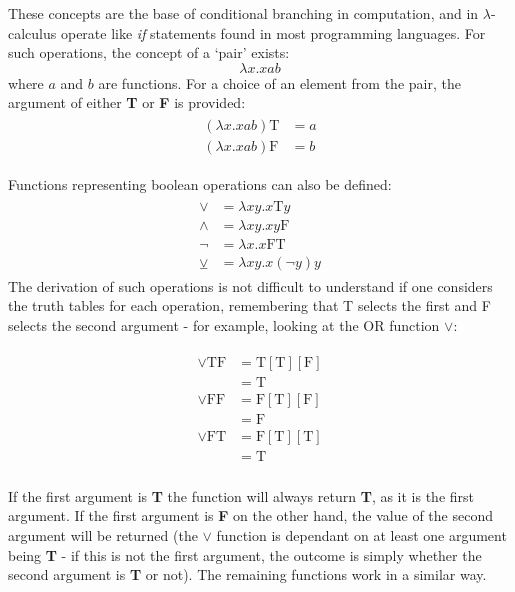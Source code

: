 \documentclass[Master.tex]{subfiles}
\begin{document}
These concepts are the base of conditional branching in computation, and in $\lambda$-calculus operate like \textit{if} statements found in most programming languages. For such operations, the concept of a `pair' exists:
\cite{church1941lambda}
\begin{equation*}
\lambda x.xab
\end{equation*}
where $a$ and $b$ are functions. For a choice of an element from the pair, the argument of either \textbf{T} or \textbf{F} is provided:
\begin{gather*}
\begin{aligned}
(\lambda x.xab)\bm{\mathrm{T}} &= a\\
(\lambda x.xab)\bm{\mathrm{F}} &= b
\end{aligned}
\end{gather*}

Functions representing boolean operations can also be defined:
\cite{rojas2015lambdatutorial}
\begin{gather*}
\begin{aligned}
\vee &= \lambda xy.x\bm{\mathrm{T}}y\\
\wedge &= \lambda xy.xy\bm{\mathrm{F}}\\
\lnot &= \lambda x.x\bm{\mathrm{FT}} \\
\veebar &= \lambda xy.x(\lnot y)y
\end{aligned}
\end{gather*}
The derivation of such operations is not difficult to understand if one considers the truth tables for each operation, remembering that T selects the first and F selects the second argument - for example, looking at the OR function $\vee$:

\begin{gather*}
\begin{aligned}
\vee \bm{\mathrm{TF}} &= \bm{\mathrm{T}}[\bm{\mathrm{T}}][\bm{\mathrm{F}}] \\
&= \bm{\mathrm{T}} \\
\vee \bm{\mathrm{FF}} &= \bm{\mathrm{F}}[\bm{\mathrm{T}}][\bm{\mathrm{F}}] \\
&= \bm{\mathrm{F}} \\
\vee \bm{\mathrm{FT}} &= \bm{\mathrm{F}}[\bm{\mathrm{T}}][\bm{\mathrm{T}}] \\
&= \bm{\mathrm{T}} \\
\end{aligned}
\end{gather*}

If the first argument is \textbf{T} the function will always return \textbf{T}, as it is the first argument. If the first argument is \textbf{F} on the other hand, the value of the second argument will be returned (the $\vee$ function is dependant on at least one argument being \textbf{T} - if this is not the first argument, the outcome is simply whether the second argument is \textbf{T} or not). The remaining functions work in a similar way.
\end{document}
